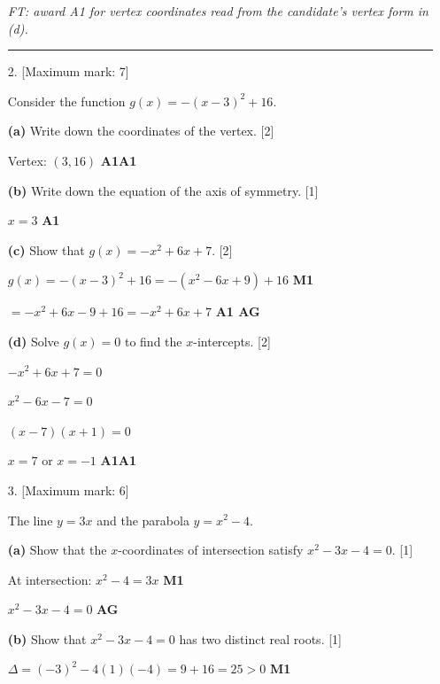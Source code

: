 \documentclass[12pt, twoside]{article}
\begin{document}
\begin{enumerate}[itemsep=0.3cm]
\emph{FT: award A1 for vertex coordinates read from the candidate's vertex form in (d).}

\bigskip
\hrule
\bigskip

\item[2.] [Maximum mark: 7]

Consider the function $g(x) = -(x - 3)^2 + 16$.

\medskip

\textbf{(a)} Write down the coordinates of the vertex. \hfill [2]

Vertex: $(3, 16)$ \hfill \textbf{A1A1}

\medskip

\textbf{(b)} Write down the equation of the axis of symmetry. \hfill [1]

$x = 3$ \hfill \textbf{A1}

\medskip

\textbf{(c)} Show that $g(x) = -x^2 + 6x + 7$. \hfill [2]

$g(x) = -(x - 3)^2 + 16 = -(x^2 - 6x + 9) + 16$ \hfill \textbf{M1}

$= -x^2 + 6x - 9 + 16 = -x^2 + 6x + 7$ \hfill \textbf{A1 AG}

\medskip

\textbf{(d)} Solve $g(x) = 0$ to find the $x$-intercepts. \hfill [2]

$-x^2 + 6x + 7 = 0$

$x^2 - 6x - 7 = 0$

$(x - 7)(x + 1) = 0$

$x = 7$ or $x = -1$ \hfill \textbf{A1A1}

\newpage

\item[3.] [Maximum mark: 6]

The line $y = 3x$ and the parabola $y = x^2 - 4$.

\medskip

\textbf{(a)} Show that the $x$-coordinates of intersection
satisfy $x^2 - 3x - 4 = 0$. \hfill [1]

At intersection: $x^2 - 4 = 3x$ \hfill \textbf{M1}

$x^2 - 3x - 4 = 0$ \hfill \textbf{AG}

\medskip

\textbf{(b)} Show that $x^2 - 3x - 4 = 0$ has two distinct
real roots. \hfill [1]

$\Delta = (-3)^2 - 4(1)(-4) = 9 + 16 = 25 > 0$ \hfill \textbf{M1}


\end{enumerate}
\end{document}
